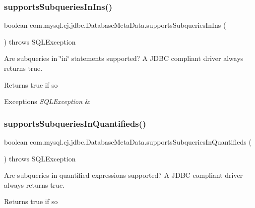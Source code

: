 \subsubsection{\texorpdfstring{supports\+Subqueries\+In\+Ins()}{supportsSubqueriesInIns()}}
{\footnotesize\ttfamily boolean com.\+mysql.\+cj.\+jdbc.\+Database\+Meta\+Data.\+supports\+Subqueries\+In\+Ins (\begin{DoxyParamCaption}{ }\end{DoxyParamCaption}) throws S\+Q\+L\+Exception}

Are subqueries in \char`\"{}in\char`\"{} statements supported? A J\+D\+BC compliant driver always returns true.

\begin{DoxyReturn}{Returns}
true if so 
\end{DoxyReturn}

\begin{DoxyExceptions}{Exceptions}
{\em S\+Q\+L\+Exception} & \\
\hline
\end{DoxyExceptions}
\mbox{\label{classcom_1_1mysql_1_1cj_1_1jdbc_1_1_database_meta_data_a81fa0113f5f002abf3861aae97e2db8f}} 
\subsubsection{\texorpdfstring{supports\+Subqueries\+In\+Quantifieds()}{supportsSubqueriesInQuantifieds()}}
{\footnotesize\ttfamily boolean com.\+mysql.\+cj.\+jdbc.\+Database\+Meta\+Data.\+supports\+Subqueries\+In\+Quantifieds (\begin{DoxyParamCaption}{ }\end{DoxyParamCaption}) throws S\+Q\+L\+Exception}

Are subqueries in quantified expressions supported? A J\+D\+BC compliant driver always returns true.

\begin{DoxyReturn}{Returns}
true if so 
\end{DoxyReturn}

